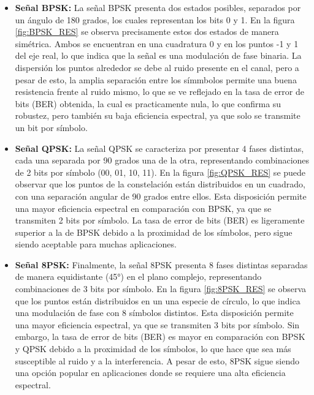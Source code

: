 \documentclass[12pt]{article}
\begin{document}
\begin{itemize}
    \item \textbf{Señal BPSK:} La señal BPSK presenta dos estados posibles, separados por un ángulo de 180 grados, los cuales representan los bits 0 y 1. En la figura \ref{fig:BPSK_RES} se observa precisamente estos dos estados de manera simétrica. Ambos se encuentran en una cuadratura 0 y en los puntos -1 y 1 del eje real, lo que indica que la señal es una modulación de fase binaria. La dispersión  los puntos alrededor se debe al ruido presente en el canal, pero a pesar de esto, la amplia separación entre los símmbolos permite una buena resistencia frente al ruido mismo, lo que se ve reflejado en la tasa de error de bits (BER) obtenida, la cual es practicamente nula, lo que confirma su robustez, pero también su baja eficiencia espectral, ya que solo se transmite un bit por símbolo.
    
    \item \textbf{Señal QPSK:} La señal QPSK se caracteriza por presentar 4 fases distintas, cada una separada por 90 grados una de la otra, representando combinaciones de 2 bits por símbolo (00, 01, 10, 11). En la figura \ref{fig:QPSK_RES} se puede observar que los puntos de la constelación están distribuidos en un cuadrado, con una separación angular de 90 grados entre ellos. Esta disposición permite una mayor eficiencia espectral en comparación con BPSK, ya que se transmiten 2 bits por símbolo. La tasa de error de bits (BER) es ligeramente superior a la de BPSK debido a la proximidad de los símbolos, pero sigue siendo aceptable para muchas aplicaciones.
    
    \item \textbf{Señal 8PSK:} Finalmente, la señal 8PSK presenta 8 fases distintas separadas de manera equidistante (45°) en el plano complejo, representando combinaciones de 3 bits por símbolo. En la figura \ref{fig:8PSK_RES} se observa que los puntos están distribuidos en un una especie de círculo, lo que indica una modulación de fase con 8 símbolos distintos. Esta disposición permite una mayor eficiencia espectral, ya que se transmiten 3 bits por símbolo. Sin embargo, la tasa de error de bits (BER) es mayor en comparación con BPSK y QPSK debido a la proximidad de los símbolos, lo que hace que sea más susceptible al ruido y a la interferencia. A pesar de esto, 8PSK sigue siendo una opción popular en aplicaciones donde se requiere una alta eficiencia espectral.
    
\end{itemize}
\end{document}

